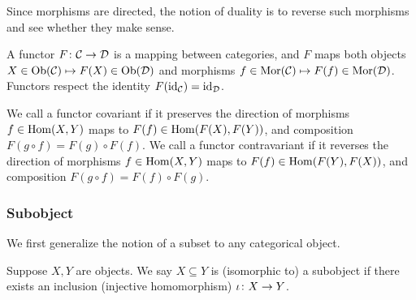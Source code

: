 \begin{remark}
    Since morphisms are directed,
    the notion of duality is to reverse such morphisms
    and see whether they make sense.
\end{remark}

\begin{definition}
    A functor \(F\colon\mathcal{C}\to\mathcal{D}\) is a mapping between categories,
    and \(F\) maps both objects \(X \in \operatorname{Ob}(\mathcal{C}) \mapsto F(X) \in \operatorname{Ob}(\mathcal{D})\)
    and morphisms \(f \in \operatorname{Mor}(\mathcal{C}) \mapsto F(f) \in \operatorname{Mor}(\mathcal{D})\).
    Functors respect the identity \(F(\operatorname{id}_{\mathcal{C}}) = \operatorname{id}_{\mathcal{D}}\).
\end{definition}

\begin{definition}
    We call a functor covariant if it preserves the direction of morphisms
    \(f \in \operatorname{Hom}(X,Y)\) maps to \(F(f) \in \operatorname{Hom}(F(X),F(Y))\),
    and composition \(F(g \circ f) = F(g) \circ F(f)\).
    We call a functor contravariant if it reverses the direction of morphisms
    \(f \in \operatorname{Hom}(X,Y)\) maps to \(F(f) \in \operatorname{Hom}(F(Y),F(X))\),
    and composition \(F(g \circ f) = F(f) \circ F(g)\).
\end{definition}

\subsubsection*{Subobject}

\begin{remark}
    We first generalize the notion of a subset to any categorical object.
\end{remark}
\begin{definition}
    Suppose \(X,Y\) are objects.
    We say \(X \subseteq Y\) is (isomorphic to) a subobject
    if there exists an inclusion (injective homomorphism)
    \(\iota\colon X\to Y\).
\end{definition}



